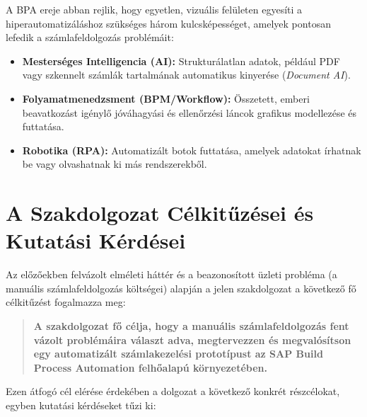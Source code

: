 A BPA ereje abban rejlik, hogy egyetlen, vizuális felületen egyesíti a hiperautomatizáláshoz szükséges három kulcsképességet, amelyek pontosan lefedik a számlafeldolgozás problémáit:
\begin{itemize}
    \item \textbf{Mesterséges Intelligencia (AI):} Strukturálatlan adatok, például PDF vagy szkennelt számlák tartalmának automatikus kinyerése (\textit{Document AI}).
    \item \textbf{Folyamatmenedzsment (BPM/Workflow):} Összetett, emberi beavatkozást igénylő jóváhagyási és ellenőrzési láncok grafikus modellezése és futtatása.
    \item \textbf{Robotika (RPA):} Automatizált botok futtatása, amelyek adatokat írhatnak be vagy olvashatnak ki más rendszerekből.
\end{itemize}


\section{A Szakdolgozat Célkitűzései és Kutatási Kérdései}
\label{sec:celkituzesek}

Az előzőekben felvázolt elméleti háttér és a beazonosított üzleti probléma (a manuális számlafeldolgozás költségei) alapján a jelen szakdolgozat a következő fő célkitűzést fogalmazza meg:

\begin{quote}
    \textbf{A szakdolgozat fő célja, hogy a manuális számlafeldolgozás fent vázolt problémáira választ adva, megtervezzen és megvalósítson egy automatizált számlakezelési prototípust az SAP Build Process Automation felhőalapú környezetében.}
\end{quote}

Ezen átfogó cél elérése érdekében a dolgozat a következő konkrét részcélokat, egyben kutatási kérdéseket tűzi ki:

